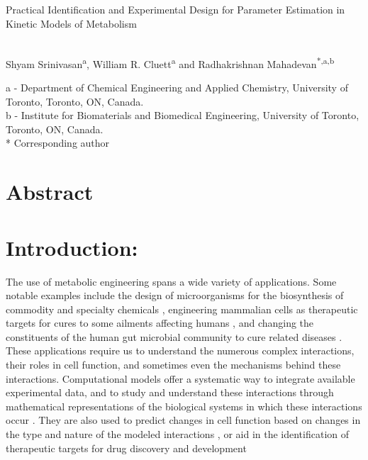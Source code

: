 \documentclass[10pt]{article}
\begin{document}
	\begin{center}
		\begin{Large}
			Practical Identification and Experimental Design for Parameter Estimation in Kinetic Models of Metabolism
		\end{Large}\\
		Shyam Srinivasan\textsuperscript{a}, William R. Cluett\textsuperscript{a} and Radhakrishnan Mahadevan\textsuperscript{*,a,b}\\
	\end{center}
	a - Department of Chemical Engineering and Applied Chemistry, University of Toronto, Toronto, ON, Canada.\\
	b - Institute for Biomaterials and Biomedical Engineering, University of Toronto, Toronto, ON, Canada.\\
	{*} Corresponding author
	\section*{Abstract}
	\section{Introduction:}
	The use of metabolic engineering spans a wide variety of applications. Some notable examples include the design of microorganisms for the biosynthesis of commodity and specialty chemicals \parencite{Andreozzi2016}, engineering mammalian cells as therapeutic targets for cures to some ailments affecting humans \parencite{DiFilippo2016,Apaolaza2017}, and changing the constituents of the human gut microbial community to cure related diseases \parencite{Zerfab2018}. These applications require us to understand the numerous complex interactions, their roles in cell function, and sometimes even the mechanisms behind these interactions. Computational models offer a systematic way to integrate available experimental data, and to study and understand these interactions through mathematical representations of the biological systems in which these interactions occur \parencite{Bordbar2014a,Saa2017}. They are also used to predict changes in cell function based on changes in the type and nature of the modeled interactions \parencite{Andreozzi2016}, or aid in the identification of therapeutic targets for drug discovery and development \parencite{Bordbar2015,Chandrasekaran2017}
	
\end{document}
